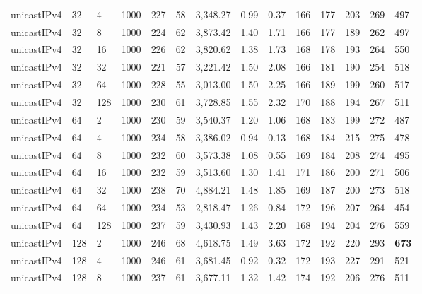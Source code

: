 \begin{table}[!htb]
\begin{tabular}{@{}llllllllllllll@{}}
		unicastIPv4 & 32           & 4     & 1000 & 227  & 58  & 3,348.27 & 0.99     & 0.37     & 166 & 177 & 203 & 269 & 497  \\
		unicastIPv4 & 32           & 8     & 1000 & 224  & 62  & 3,873.42 & 1.40     & 1.71     & 166 & 177 & 189 & 262 & 497  \\
		unicastIPv4 & 32           & 16    & 1000 & 226  & 62  & 3,820.62 & 1.38     & 1.73     & 168 & 178 & 193 & 264 & 550  \\
		unicastIPv4 & 32           & 32    & 1000 & 221  & 57  & 3,221.42 & 1.50     & 2.08     & 166 & 181 & 190 & 254 & 518  \\
		unicastIPv4 & 32           & 64    & 1000 & 228  & 55  & 3,013.00 & 1.50     & 2.25     & 166 & 189 & 199 & 260 & 517  \\
		unicastIPv4 & 32           & 128   & 1000 & 230  & 61  & 3,728.85 & 1.55     & 2.32     & 170 & 188 & 194 & 267 & 511  \\ \hline
		unicastIPv4 & 64           & 2     & 1000 & 230  & 59  & 3,540.37 & 1.20     & 1.06     & 168 & 183 & 199 & 272 & 487  \\
		unicastIPv4 & 64           & 4     & 1000 & 234  & 58  & 3,386.02 & 0.94     & 0.13     & 168 & 184 & 215 & 275 & 478  \\
		unicastIPv4 & 64           & 8     & 1000 & 232  & 60  & 3,573.38 & 1.08     & 0.55     & 169 & 184 & 208 & 274 & 495  \\
		unicastIPv4 & 64           & 16    & 1000 & 232  & 59  & 3,513.60 & 1.30     & 1.41     & 171 & 186 & 200 & 271 & 506  \\
		unicastIPv4 & 64           & 32    & 1000 & 238  & 70  & 4,884.21 & 1.48     & 1.85     & 169 & 187 & 200 & 273 & 518  \\
		unicastIPv4 & 64           & 64    & 1000 & 234  & 53  & 2,818.47 & 1.26     & 0.84     & 172 & 196 & 207 & 264 & 454  \\
		unicastIPv4 & 64           & 128   & 1000 & 237  & 59  & 3,430.93 & 1.43     & 2.20     & 168 & 194 & 204 & 276 & 559  \\ \hline
		unicastIPv4 & 128          & 2     & 1000 & 246  & 68  & 4,618.75 & 1.49     & 3.63     & 172 & 192 & 220 & 293 & \textbf{673}  \\
		unicastIPv4 & 128          & 4     & 1000 & 246  & 61  & 3,681.45 & 0.92     & 0.32     & 172 & 193 & 227 & 291 & 521  \\
		unicastIPv4 & 128          & 8     & 1000 & 237  & 61  & 3,677.11 & 1.32     & 1.42     & 174 & 192 & 206 & 276 & 511  \\

\end{tabular}
\end{table}
